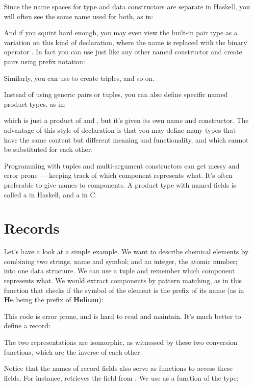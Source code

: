 Since the name spaces for type and data constructors are separate in
Haskell, you will often see the same name used for both, as in:

And if you squint hard enough, you may even view the built-in pair type
as a variation on this kind of declaration, where the name 
is replaced with the binary operator \code{(,)}. In fact you can use
\code{(,)} just like any other named constructor and create pairs
using prefix notation:

Similarly, you can use \code{(,,)} to create triples, and so on.

Instead of using generic pairs or tuples, you can also define specific
named product types, as in:

which is just a product of  and , but it's
given its own name and constructor. The advantage of this style of
declaration is that you may define many types that have the same content
but different meaning and functionality, and which cannot be substituted
for each other.

Programming with tuples and multi-argument constructors can get messy
and error prone --- keeping track of which component represents what.
It's often preferable to give names to components. A product type with
named fields is called a  in Haskell, and a  in C.

\section{Records}

Let's have a look at a simple example. We want to describe chemical
elements by combining two strings, name and symbol; and an integer, the
atomic number; into one data structure. We can use a tuple
 and remember which component represents
what. We would extract components by pattern matching, as in this
function that checks if the symbol of the element is the prefix of its
name (as in \textbf{He} being the prefix of \textbf{Helium}):

This code is error prone, and is hard to read and maintain. It's much
better to define a record:

The two representations are isomorphic, as witnessed by these two
conversion functions, which are the inverse of each other:


Notice that the names of record fields also serve as functions to access
these fields. For instance,  retrieves the
 field from . We use
 as a function of the type:

